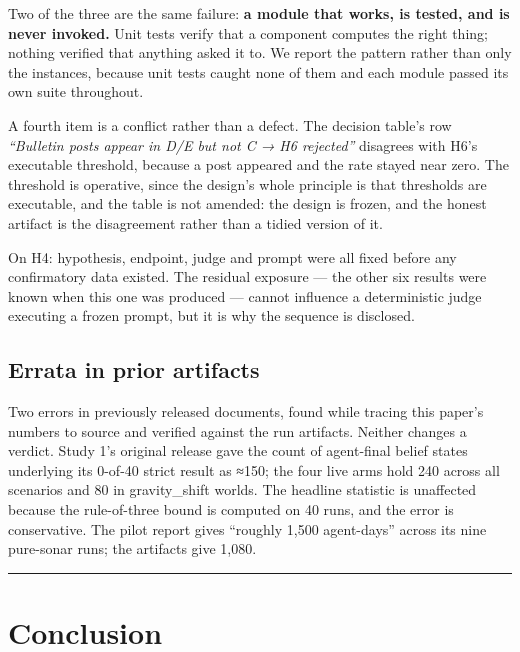 \documentclass[pdflatex,sn-basic]{sn-jnl}
\begin{document}
Two of the three are the same failure: \textbf{a module that works, is tested, and is never invoked.}
Unit tests verify that a component computes the right thing; nothing verified that anything asked
it to. We report the pattern rather than only the instances, because unit tests caught none of
them and each module passed its own suite throughout.

A fourth item is a conflict rather than a defect. The decision table's row \emph{``Bulletin posts appear
in D/E but not C → H6 rejected''} disagrees with H6's executable threshold, because a post appeared
and the rate stayed near zero. The threshold is operative, since the design's whole principle is
that thresholds are executable, and the table is not amended: the design is frozen, and the honest
artifact is the disagreement rather than a tidied version of it.

On H4: hypothesis, endpoint, judge and prompt were all fixed before any confirmatory data
existed. The residual exposure --- the other six results were known when this one was produced
--- cannot influence a deterministic judge executing a frozen prompt, but it is why the
sequence is disclosed.

\hypertarget{errata-in-prior-artifacts}{%
\subsection{Errata in prior artifacts}\label{errata-in-prior-artifacts}}

Two errors in previously released documents, found while tracing
this paper's numbers to source and verified against the run artifacts. Neither changes a verdict.
Study 1's original release gave the count of agent-final belief states underlying its
0-of-40 strict result as ≈150; the four live arms hold 240 across all scenarios and 80 in
gravity\_shift worlds. The headline statistic is unaffected
because the rule-of-three bound is computed on 40 runs, and the error is conservative. The pilot
report gives ``roughly 1,500 agent-days'' across its nine pure-sonar runs; the artifacts give
1,080.

\begin{center}\rule{0.5\linewidth}{0.5pt}\end{center}

\hypertarget{conclusion}{%
\section{Conclusion}\label{conclusion}}
\end{document}
